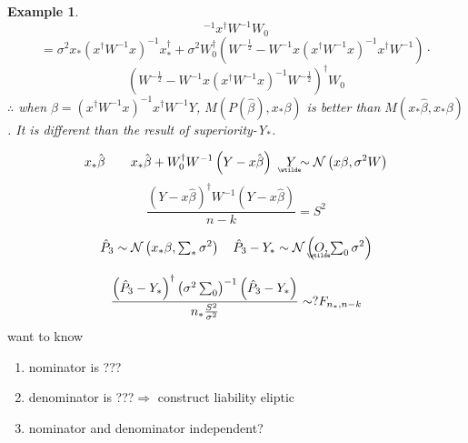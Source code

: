 \documentclass{article}
\newtheorem{example}[theorem]{Example}
\begin{document}
\begin{example}
\begin{equation*}
^{-1}x^{\dagger }W^{-1}W_{0}
\end{equation*}%
\begin{equation*}
=\sigma ^{2}x_{\ast }\left( x^{\dagger }W^{-1}x\right) ^{-1}x_{\ast
}^{\dagger }+\sigma ^{2}W_{0}^{\dagger }\left( W^{-\frac{1}{2}%
}-W^{-1}x\left( x^{\dagger }W^{-1}x\right) ^{-1}x^{\dagger }W^{-1}\right)
\cdot
\end{equation*}%
\begin{equation*}
\left( W^{-\frac{1}{2}}-W^{-1}x\left( x^{\dagger }W^{-1}x\right) ^{-1}W^{-%
\frac{1}{2}}\right) ^{\dagger }W_{0}
\end{equation*}%
$\therefore $ when $\hat{\beta}=\left( x^{\dagger }W^{-1}x\right)
^{-1}x^{\dagger }W^{-1}Y$, $M\left( P\left( \hat{\beta}\right) ,x_{\ast
}\beta \right) $ is better than $M\left( x_{\ast }\hat{\beta},x_{\ast }\beta
\right) $. It is different than the result of superiority-Y$_{\ast }$.
\end{example}

\bigskip

\bigskip

\begin{equation*}
x_{\ast }\hat{\beta}\quad \quad x_{\ast }\hat{\beta}+W_{0}^{\dagger
}W^{-1}\left( Y-x\hat{\beta}\right) \quad 
\underaccent{\wtilde}{Y}%
\sim \mathcal{N}\left( x\beta ,\sigma ^{2}W\right)
\end{equation*}%
\begin{equation*}
\frac{\left( Y-x\hat{\beta}\right) ^{\dagger }W^{-1}\left( Y-x\hat{\beta}%
\right) }{n-k}=S^{2}
\end{equation*}

\begin{equation*}
\hat{P}_{3}\sim \mathcal{N}\left( x_{\ast }\beta ,\tsum\nolimits_{\ast
}\sigma ^{2}\right) \quad \hat{P}_{3}-Y_{\ast }\sim \mathcal{N}\left( 
\underaccent{\wtilde}{O}%
,\tsum\nolimits_{0}\sigma ^{2}\right)
\end{equation*}

\begin{equation*}
\frac{\left( \hat{P}_{3}-Y_{\ast }\right) ^{\dagger }\left( \sigma
^{2}\tsum\nolimits_{0}\right) ^{-1}\left( \hat{P}_{3}-Y_{\ast }\right) }{%
n_{\ast }\frac{S^{2}}{\sigma ^{2}}}\sim ?F_{n_{\ast },n-k}
\end{equation*}%
want to know

\begin{enumerate}
\item nominator is ???

\item denominator is ???\qquad \qquad \qquad \qquad \qquad $\Longrightarrow $%
construct liability eliptic

\item nominator and denominator independent?
\end{enumerate}
\end{document}
